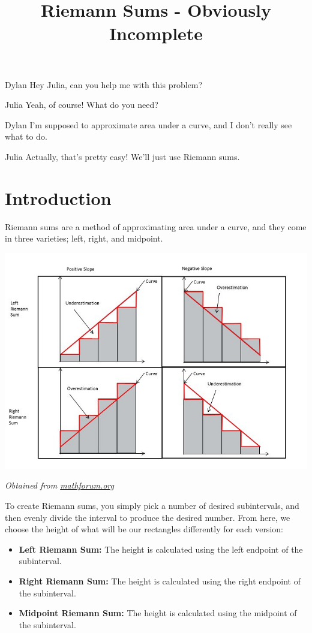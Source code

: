 \documentclass{ximera}
\title{Riemann Sums - Obviously Incomplete}
\begin{document}
\maketitle
\begin{dialogue}
\item[Dylan] Hey Julia, can you help me with this problem?
\item[Julia] Yeah, of course! What do you need?
\item[Dylan] I'm supposed to approximate area under a curve, and I don't really see what to do.
\item[Julia] Actually, that's pretty easy! We'll just use Riemann sums.
\end{dialogue}

\section{Introduction}
Riemann sums are a method of approximating area under a curve, and they come in three varieties; left, right, and midpoint.

\begin{image}
\includegraphics{Table}
\end{image}
\begin{center}
\textit{Obtained from \href{http://mathforum.org/mathimages/index.php/Riemann_Sums}{mathforum.org}}
\end{center}


To create Riemann sums, you simply pick a number of desired subintervals, and then evenly divide the interval to produce the desired number. From here, we choose the height of what will be our rectangles differently for each version:
\begin{itemize}
\item{\textbf{Left Riemann Sum:} The height is calculated using the left endpoint of the subinterval.}
\item{\textbf{Right Riemann Sum:} The height is calculated using the right endpoint of the subinterval.}
\item{\textbf{Midpoint Riemann Sum:} The height is calculated using the midpoint of the subinterval.}
\end{itemize}
\end{document}

